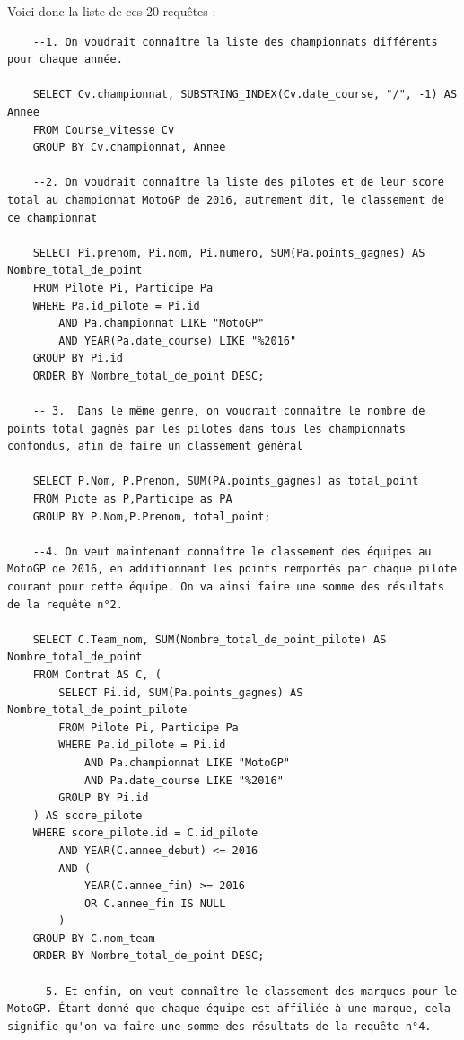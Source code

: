 \documentclass[12pt,a4paper]{article}
\newenvironment{code}{\captionsetup{type=listing}}{}
\begin{document}
Voici donc la liste de ces 20 requêtes :
\begin{code}
    \begin{verbatim}
    --1. On voudrait connaître la liste des championnats différents pour chaque année.

    SELECT Cv.championnat, SUBSTRING_INDEX(Cv.date_course, "/", -1) AS Annee
    FROM Course_vitesse Cv
    GROUP BY Cv.championnat, Annee

    --2. On voudrait connaître la liste des pilotes et de leur score total au championnat MotoGP de 2016, autrement dit, le classement de ce championnat

    SELECT Pi.prenom, Pi.nom, Pi.numero, SUM(Pa.points_gagnes) AS Nombre_total_de_point
    FROM Pilote Pi, Participe Pa
    WHERE Pa.id_pilote = Pi.id
        AND Pa.championnat LIKE "MotoGP"
        AND YEAR(Pa.date_course) LIKE "%2016"
    GROUP BY Pi.id
    ORDER BY Nombre_total_de_point DESC;

    -- 3.  Dans le même genre, on voudrait connaître le nombre de points total gagnés par les pilotes dans tous les championnats confondus, afin de faire un classement général

    SELECT P.Nom, P.Prenom, SUM(PA.points_gagnes) as total_point
    FROM Piote as P,Participe as PA
    GROUP BY P.Nom,P.Prenom, total_point;

    --4. On veut maintenant connaître le classement des équipes au MotoGP de 2016, en additionnant les points remportés par chaque pilote courant pour cette équipe. On va ainsi faire une somme des résultats de la requête n°2.

    SELECT C.Team_nom, SUM(Nombre_total_de_point_pilote) AS Nombre_total_de_point
    FROM Contrat AS C, (
        SELECT Pi.id, SUM(Pa.points_gagnes) AS Nombre_total_de_point_pilote
        FROM Pilote Pi, Participe Pa
        WHERE Pa.id_pilote = Pi.id
            AND Pa.championnat LIKE "MotoGP"
            AND Pa.date_course LIKE "%2016"
        GROUP BY Pi.id
    ) AS score_pilote
    WHERE score_pilote.id = C.id_pilote
        AND YEAR(C.annee_debut) <= 2016
        AND (
            YEAR(C.annee_fin) >= 2016
            OR C.annee_fin IS NULL
        )
    GROUP BY C.nom_team
    ORDER BY Nombre_total_de_point DESC;

    --5. Et enfin, on veut connaître le classement des marques pour le MotoGP. Étant donné que chaque équipe est affiliée à une marque, cela signifie qu'on va faire une somme des résultats de la requête n°4.


\end{verbatim}
\end{code}
\end{document}

